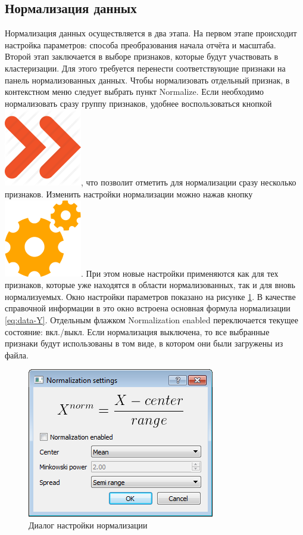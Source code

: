 \documentclass[12pt]{diploma}
\begin{document}
	\subsection{Нормализация данных}
	
	Нормализация данных осуществляется в два этапа. На первом этапе происходит настройка параметров: способа преобразования начала отчёта и масштаба. Второй этап заключается в выборе признаков, которые будут участвовать в кластеризации. Для этого требуется перенести соответствующие признаки на панель нормализованных данных. Чтобы нормализовать отдельный признак, в контекстном меню следует выбрать пункт Normalize. Если необходимо нормализовать сразу группу признаков, удобнее воспользоваться кнопкой \includegraphics[scale=0.1]{img/norm_all}, что позволит отметить для нормализации сразу несколько признаков. Изменить настройки нормализации можно нажав кнопку \includegraphics[scale=0.1]{img/settings}. При этом новые настройки применяются как для тех признаков, которые уже находятся в области нормализованных, так и для вновь нормализуемых. Окно настройки параметров показано на рисунке \ref{fig:norm-dialog}. В качестве справочной информации в это окно встроена основная формула нормализации \eqref{eq:data-Y}. Отдельным флажком Normalization enabled переключается текущее состояние: вкл./выкл. Если нормализация выключена, то все выбранные признаки будут использованы в том виде, в котором они были загружены из файла.
	
	\begin{figure}[h!]
		\centering
		\includegraphics[width=0.35\linewidth]{img/instruction/norm-dialog}
		\caption{Диалог настройки нормализации}
		\label{fig:norm-dialog}
	\end{figure}
	
\end{document}
